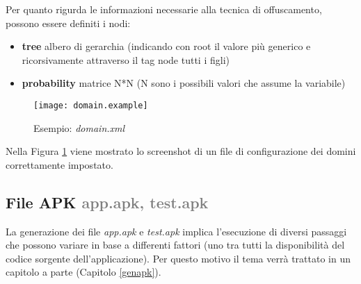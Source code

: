 \noindent Per quanto rigurda le informazioni necessarie alla tecnica di offuscamento, possono essere definiti i nodi:
\begin{itemize}[nosep]
\item \textbf{tree}  albero di gerarchia (indicando con root il valore più generico e ricorsivamente attraverso il tag node tutti i figli)
\item \textbf{probability} matrice N*N (N sono i possibili valori che assume la variabile)
\end{itemize}
\begin{figure}[H]
	\texttt{[image: domain.example]}
	\centering
	\caption{Esempio: \emph{domain.xml}}
    \label{fig:domainexample}
\end{figure}
Nella Figura \ref{fig:domainexample} viene mostrato lo screenshot di un file di configurazione dei domini correttamente impostato.

\subsection*{File APK \textcolor{gray}{app.apk, test.apk}}   
La generazione dei file \emph{app.apk} e \emph{test.apk} implica l'esecuzione di diversi passaggi  che possono variare in base a differenti fattori (uno tra tutti la disponibilità del codice sorgente dell'applicazione). Per questo motivo il tema verrà trattato in un capitolo a parte (Capitolo \ref{genapk}).